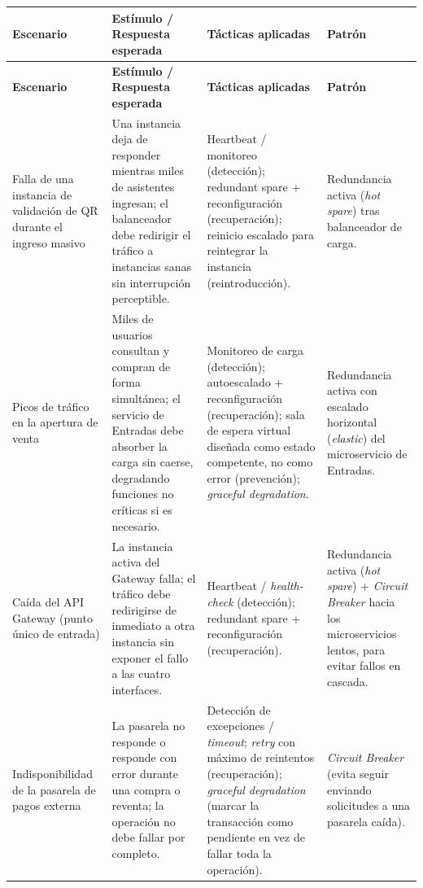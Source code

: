 \documentclass[12pt,a4paper]{article}
\begin{document}
\begin{center}
\begin{longtable}{p{2.6cm}p{4.7cm}p{3.6cm}p{2.9cm}}
\toprule
\textbf{Escenario} & \textbf{Estímulo / Respuesta esperada} & \textbf{Tácticas aplicadas} & \textbf{Patrón}\\
\midrule
\endfirsthead
\toprule
\textbf{Escenario} & \textbf{Estímulo / Respuesta esperada} & \textbf{Tácticas aplicadas} & \textbf{Patrón}\\
\midrule
\endhead
Falla de una instancia de validación de QR durante el ingreso masivo &
Una instancia deja de responder mientras miles de asistentes ingresan; el balanceador debe
redirigir el tráfico a instancias sanas sin interrupción perceptible. &
Heartbeat / monitoreo (detección); redundant spare + reconfiguración (recuperación); reinicio
escalado para reintegrar la instancia (reintroducción). &
Redundancia activa (\textit{hot spare}) tras balanceador de carga.\\[0.5em]

Picos de tráfico en la apertura de venta &
Miles de usuarios consultan y compran de forma simultánea; el servicio de Entradas debe absorber
la carga sin caerse, degradando funciones no críticas si es necesario. &
Monitoreo de carga (detección); autoescalado + reconfiguración (recuperación); sala de espera
virtual diseñada como estado competente, no como error (prevención); \textit{graceful
degradation}. &
Redundancia activa con escalado horizontal (\textit{elastic}) del microservicio de Entradas.\\[0.5em]

Caída del API Gateway (punto único de entrada) &
La instancia activa del Gateway falla; el tráfico debe redirigirse de inmediato a otra instancia
sin exponer el fallo a las cuatro interfaces. &
Heartbeat / \textit{health-check} (detección); redundant spare + reconfiguración (recuperación). &
Redundancia activa (\textit{hot spare}) + \textit{Circuit Breaker} hacia los microservicios
lentos, para evitar fallos en cascada.\\[0.5em]

Indisponibilidad de la pasarela de pagos externa &
La pasarela no responde o responde con error durante una compra o reventa; la operación no debe
fallar por completo. &
Detección de excepciones / \textit{timeout}; \textit{retry} con máximo de reintentos
(recuperación); \textit{graceful degradation} (marcar la transacción como pendiente en vez de
fallar toda la operación). &
\textit{Circuit Breaker} (evita seguir enviando solicitudes a una pasarela caída).\\[0.5em]


\end{longtable}
\end{center}
\end{document}

